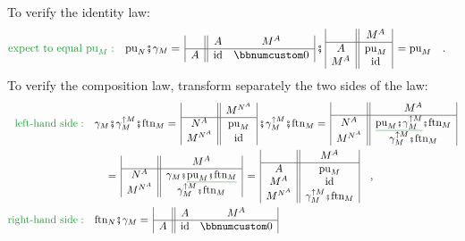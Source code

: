To verify the identity law:
\begin{align*}
{\color{greenunder}\text{expect to equal }\text{pu}_{M}:}\quad & \text{pu}_{N}\bef\gamma_{M}=\,\begin{array}{|c||cc|}
 & A & M^{A}\\
\hline A & \text{id} & \bbnum 0
\end{array}\,\bef\,\begin{array}{|c||c|}
 & M^{A}\\
\hline A & \text{pu}_{M}\\
M^{A} & \text{id}
\end{array}\,=\text{pu}_{M}\quad.
\end{align*}
To verify the composition law, transform separately the two sides
of the law:
\begin{align*}
{\color{greenunder}\text{left-hand side}:}\quad & \gamma_{M}\bef\gamma_{M}^{\uparrow M}\bef\text{ftn}_{M}=\,\begin{array}{|c||c|}
 & M^{N^{A}}\\
\hline N^{A} & \text{pu}_{M}\\
M^{N^{A}} & \text{id}
\end{array}\,\bef\gamma_{M}^{\uparrow M}\bef\text{ftn}_{M}=\,\begin{array}{|c||c|}
 & M^{A}\\
\hline N^{A} & \gunderline{\text{pu}_{M}\bef\gamma_{M}^{\uparrow M}}\bef\text{ftn}_{M}\\
M^{N^{A}} & \gamma_{M}^{\uparrow M}\bef\text{ftn}_{M}
\end{array}\\
 & \quad=\,\begin{array}{|c||c|}
 & M^{A}\\
\hline N^{A} & \gamma_{M}\bef\gunderline{\text{pu}_{M}\bef\text{ftn}_{M}}\\
M^{N^{A}} & \gamma_{M}^{\uparrow M}\bef\text{ftn}_{M}
\end{array}\,=\,\begin{array}{|c||c|}
 & M^{A}\\
\hline A & \text{pu}_{M}\\
M^{A} & \text{id}\\
M^{N^{A}} & \gamma_{M}^{\uparrow M}\bef\text{ftn}_{M}
\end{array}\quad,\\
{\color{greenunder}\text{right-hand side}:}\quad & \text{ftn}_{N}\bef\gamma_{M}=\,\begin{array}{|c||cc|}
 & A & M^{A}\\
\hline A & \text{id} & \bbnum 0\\

\end{array}
\end{align*}
